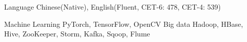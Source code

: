 

\begin{cvskills}
	
	\cvskill
	{Language } %
	{Chinese(Native), English(Fluent, CET-6: 478, CET-4: 539)} %

	\cvskill
	{Machine Learning} %
	{PyTorch, TensorFlow, OpenCV} %
  \cvskill
    {Big data} %
    {Hadoop, HBase, Hive, ZooKeeper, Storm, Kafka, Sqoop, Flume} %

\end{cvskills}
